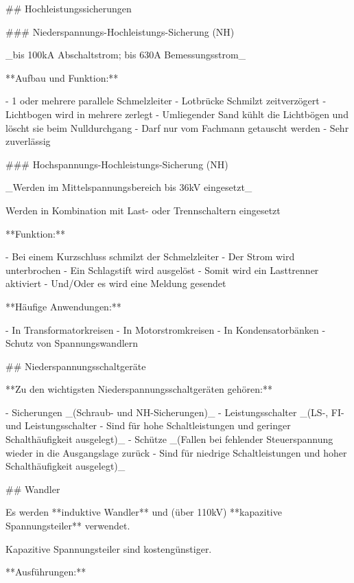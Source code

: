 \begin{markdown}

## Hochleistungssicherungen

### Niederspannungs-Hochleistungs-Sicherung (NH)

_bis 100kA Abschaltstrom; bis 630A Bemessungsstrom_

**Aufbau und Funktion:**

- 1 oder mehrere parallele Schmelzleiter
- Lotbrücke Schmilzt zeitverzögert
- Lichtbogen wird in mehrere zerlegt
- Umliegender Sand kühlt die Lichtbögen und löscht sie beim Nulldurchgang
- Darf nur vom Fachmann getauscht werden
- Sehr zuverlässig

### Hochspannungs-Hochleistungs-Sicherung (NH)

_Werden im Mittelspannungsbereich bis 36kV eingesetzt_

Werden in Kombination mit Last- oder Trennschaltern eingesetzt

**Funktion:**

- Bei einem Kurzschluss schmilzt der Schmelzleiter - Der Strom wird unterbrochen
- Ein Schlagstift wird ausgelöst
- Somit wird ein Lasttrenner aktiviert
- Und/Oder es wird eine Meldung gesendet

**Häufige Anwendungen:**

- In Transformatorkreisen
- In Motorstromkreisen
- In Kondensatorbänken
- Schutz von Spannungswandlern

## Niederspannungsschaltgeräte

**Zu den wichtigsten Niederspannungsschaltgeräten gehören:**

- Sicherungen _(Schraub- und NH-Sicherungen)_
- Leistungsschalter _(LS-, FI- und Leistungsschalter - Sind für hohe Schaltleistungen und geringer Schalthäufigkeit ausgelegt)_
- Schütze _(Fallen bei fehlender Steuerspannung wieder in die Ausgangslage zurück - Sind für niedrige Schaltleistungen und hoher Schalthäufigkeit ausgelegt)_

## Wandler


Es werden **induktive Wandler** und (über 110kV) **kapazitive Spannungsteiler** verwendet.

Kapazitive Spannungsteiler sind kostengünstiger.

**Ausführungen:**


\end{markdown}
